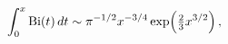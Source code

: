 \[\int_{0}^{x}\mathop{\mathrm{Bi}\/}\nolimits\!\left(t\right)dt\sim\pi^{-1/2}x^{%
-3/4}\mathop{\exp\/}\nolimits\!\left(\tfrac{2}{3}x^{3/2}\right),\]